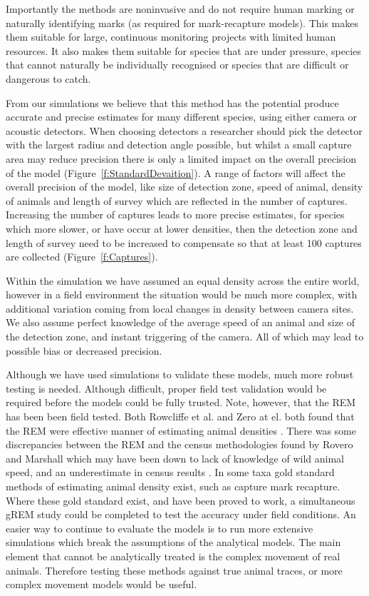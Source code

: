 \documentclass[a4paper,10pt,reqno,oneside]{amsart}
\begin{document}
Importantly the methods are noninvasive and do not require human marking or naturally identifying marks (as required for mark-recapture models). This makes them suitable for large, continuous monitoring projects with limited human resources. It also makes them suitable for species that are under pressure, species that cannot naturally be individually recognised or species that are difficult or dangerous to catch.

From our simulations  we believe that this method has the potential produce accurate and precise estimates for many different species, using either camera or acoustic detectors. When choosing detectors a researcher should pick the detector with the largest radius and detection angle possible, but whilst a small capture area may reduce precision there is only a limited impact on the overall precision of the model (Figure~\ref{f:StandardDevaition}). A range of factors will affect the overall precision of the model, like size of detection zone, speed of animal, density of animals and length of survey which are reflected in the number of captures. Increasing the number of captures leads to more precise estimates, for species which more slower, or have occur at lower densities, then the detection zone and length of survey need to be increased to compensate so that at least 100 captures are collected (Figure~\ref{f:Captures}).

Within the simulation we have assumed an equal density across the entire world, however in a field environment the situation would be much more complex, with additional variation coming from local changes in density between camera sites. We also assume perfect knowledge of the average speed of an animal and size of the detection zone, and instant triggering of the camera. All of which may lead to possible bias or decreased precision.    

Although we have used simulations to validate these models, much more robust testing is needed. Although difficult, proper field test validation would be required before the models could be fully trusted. Note, however, that the REM \citep{rowcliffe2008estimating} has been been field tested. Both Rowcliffe et al. and Zero at el. both found that the REM were effective manner of estimating animal densities \citep{rowcliffe2008estimating, zero2013monitoring}. There was some discrepancies between the REM and the census methodologies found by Rovero and Marshall which may have been down to lack of knowledge of wild animal speed, and an underestimate in census results \citep{rovero2009camera}. In some taxa gold standard methods of estimating animal density exist, such as capture mark recapture. Where these gold standard exist, and have been proved to work, a simultaneous gREM study could be completed to test the accuracy under field conditions. An easier way to continue to evaluate the models is to run more extensive simulations which break the assumptions of the analytical models. The main element that cannot be analytically treated is the complex movement of real animals. Therefore testing these methods against true animal traces, or more complex movement models would be useful.
\end{document}

